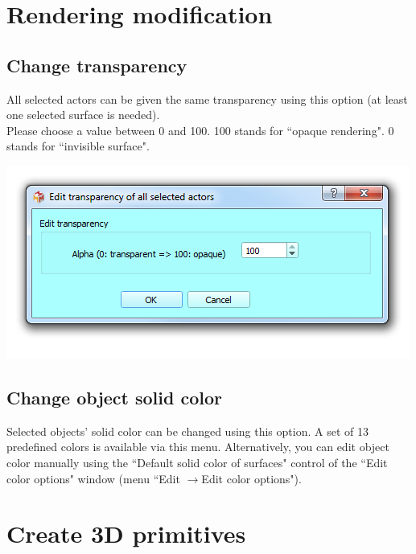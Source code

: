 \section{Rendering modification}



\subsection{Change transparency}
\noindent
\begin{minipage}{0.4\textwidth}
All selected actors can be given the same transparency using this option (at least one selected surface is needed).\\
Please choose a value between 0 and 100. 100 stands for ``opaque rendering". 0 stands for ``invisible surface".\\


\end{minipage}    
\begin{minipage}{0.6\textwidth}\centering
  \includegraphics[scale=0.5]{images/09/rendering/transparency.png}
 \end{minipage} 
\noindent





\subsection{Change object solid color}
Selected objects' solid color can be changed using this option. A set of 13 predefined colors is available via this menu. Alternatively, you can edit object color manually using the ``Default solid color of surfaces" control of the ``Edit color options" window (menu ``Edit $\rightarrow$Edit color options").

\section{Create 3D primitives}

